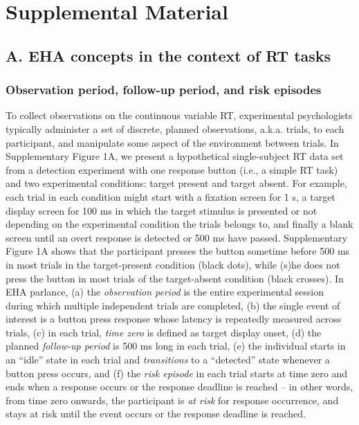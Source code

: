 \documentclass[
  english,
  man,floatsintext]{apa6}
\author{\phantom{0}}
\date{}
\affiliation{\phantom{0}}
\begin{document}
\renewcommand{\figurename}{Supplementary Figure}
\renewcommand{\tablename}{Supplemetentary Table}

\section{Supplemental Material}\label{supplemental-material}

\subsection{A. EHA concepts in the context of RT tasks}\label{a.-eha-concepts-in-the-context-of-rt-tasks}

\subsubsection{Observation period, follow-up period, and risk episodes}\label{observation-period-follow-up-period-and-risk-episodes}

To collect observations on the continuous variable RT, experimental psychologists typically administer a set of discrete, planned observations, a.k.a. trials, to each participant, and manipulate some aspect of the environment between trials. In Supplementary Figure 1A, we present a hypothetical single-subject RT data set from a detection experiment with one response button (i.e., a simple RT task) and two experimental conditions: target present and target absent. For example, each trial in each condition might start with a fixation screen for 1 s, a target display screen for 100 ms in which the target stimulus is presented or not depending on the experimental condition the trials belongs to, and finally a blank screen until an overt response is detected or 500 ms have passed. Supplementary Figure 1A shows that the participant presses the button sometime before 500 ms in most trials in the target-present condition (black dots), while (s)he does not press the button in most trials of the target-absent condition (black crosses). In EHA parlance, (a) the \emph{observation period} is the entire experimental session during which multiple independent trials are completed, (b) the single event of interest is a button press response whose latency is repeatedly measured across trials, (c) in each trial, \emph{time zero} is defined as target display onset, (d) the planned \emph{follow-up period} is 500 ms long in each trial, (e) the individual starts in an ``idle'' state in each trial and \emph{transitions} to a ``detected'' state whenever a button press occurs, and (f) the \emph{risk episode} in each trial starts at time zero and ends when a response occurs or the response deadline is reached -- in other words, from time zero onwards, the participant is \emph{at risk} for response occurrence, and stays at risk until the event occurs or the response deadline is reached.
\end{document}
